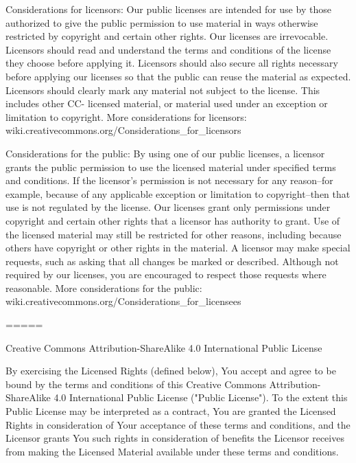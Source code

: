      Considerations for licensors: Our public licenses are
     intended for use by those authorized to give the public
     permission to use material in ways otherwise restricted by
     copyright and certain other rights. Our licenses are
     irrevocable. Licensors should read and understand the terms
     and conditions of the license they choose before applying it.
     Licensors should also secure all rights necessary before
     applying our licenses so that the public can reuse the
     material as expected. Licensors should clearly mark any
     material not subject to the license. This includes other CC-
     licensed material, or material used under an exception or
     limitation to copyright. More considerations for licensors:
	wiki.creativecommons.org/Considerations\_for\_licensors

     Considerations for the public: By using one of our public
     licenses, a licensor grants the public permission to use the
     licensed material under specified terms and conditions. If
     the licensor's permission is not necessary for any reason--for
     example, because of any applicable exception or limitation to
     copyright--then that use is not regulated by the license. Our
     licenses grant only permissions under copyright and certain
     other rights that a licensor has authority to grant. Use of
     the licensed material may still be restricted for other
     reasons, including because others have copyright or other
     rights in the material. A licensor may make special requests,
     such as asking that all changes be marked or described.
     Although not required by our licenses, you are encouraged to
     respect those requests where reasonable. More considerations
     for the public: 
	wiki.creativecommons.org/Considerations\_for\_licensees

=====

Creative Commons Attribution-ShareAlike 4.0 International Public
License

By exercising the Licensed Rights (defined below), You accept and agree
to be bound by the terms and conditions of this Creative Commons
Attribution-ShareAlike 4.0 International Public License ("Public
License"). To the extent this Public License may be interpreted as a
contract, You are granted the Licensed Rights in consideration of Your
acceptance of these terms and conditions, and the Licensor grants You
such rights in consideration of benefits the Licensor receives from
making the Licensed Material available under these terms and
conditions.


